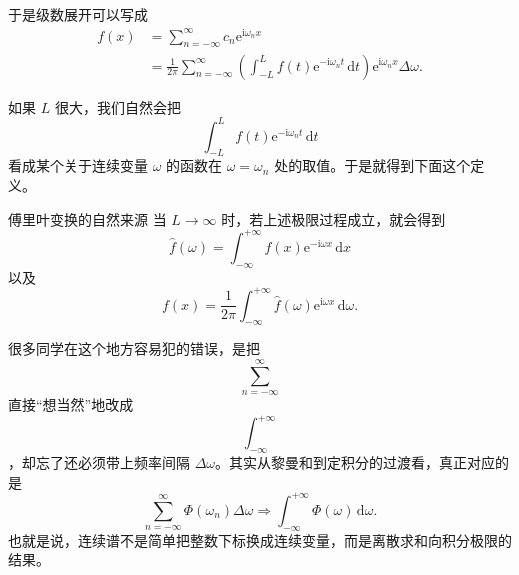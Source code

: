 于是级数展开可以写成
\begin{align}
    f(x)
    &=
    \sum_{n=-\infty}^{\infty} c_n \mathrm{e}^{\mathrm{i}\omega_n x} \\
    &=
    \frac{1}{2\pi}\sum_{n=-\infty}^{\infty}
    \left(
        \int_{-L}^{L} f(t)\mathrm{e}^{-\mathrm{i}\omega_n t}\,\mathrm{d}t
    \right)
    \mathrm{e}^{\mathrm{i}\omega_n x}\Delta\omega.
\end{align}

如果 $L$ 很大，我们自然会把
\begin{equation}
    \int_{-L}^{L} f(t)\mathrm{e}^{-\mathrm{i}\omega_n t}\,\mathrm{d}t
\end{equation}
看成某个关于连续变量 $\omega$ 的函数在 $\omega=\omega_n$ 处的取值。于是就得到下面这个定义。

\begin{dingliyi}{傅里叶变换的自然来源}{}
当 $L\to\infty$ 时，若上述极限过程成立，就会得到
\begin{equation}
    \hat{f}(\omega)=\int_{-\infty}^{+\infty} f(x)\mathrm{e}^{-\mathrm{i}\omega x}\,\mathrm{d}x
\end{equation}
以及
\begin{equation}
    f(x)=\frac{1}{2\pi}\int_{-\infty}^{+\infty} \hat{f}(\omega)\mathrm{e}^{\mathrm{i}\omega x}\,\mathrm{d}\omega.
\end{equation}
\end{dingliyi}

\begin{tishi}
很多同学在这个地方容易犯的错误，是把
\[
    \sum_{n=-\infty}^{\infty}
\]
直接``想当然''地改成
\[
    \int_{-\infty}^{+\infty}
\]
，却忘了还必须带上频率间隔 $\Delta\omega$。其实从黎曼和到定积分的过渡看，真正对应的是
\[
    \sum_{n=-\infty}^{\infty} \Phi(\omega_n)\Delta\omega
    \Longrightarrow
    \int_{-\infty}^{+\infty} \Phi(\omega)\,\mathrm{d}\omega.
\]
也就是说，连续谱不是简单把整数下标换成连续变量，而是离散求和向积分极限的结果。
\end{tishi}

